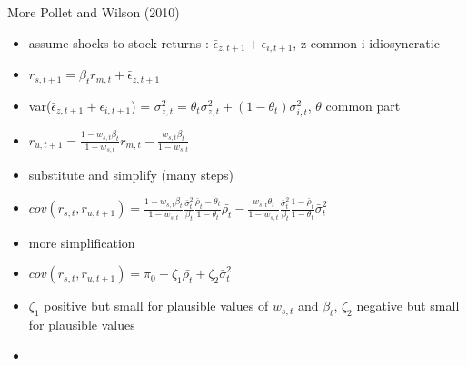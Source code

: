 \documentclass[handout]{beamer}
\begin{document}
\begin{frame}{More Pollet and Wilson (2010)}
	\begin{itemize}
		\item assume shocks to stock returns :  $\bar{\epsilon}_{z,t+1}+\epsilon_{i,t+1}$, z common i idiosyncratic
		\item $r_{s,t+1} = \beta_{t}r_{m,t} + \bar{\epsilon}_{z,t+1}$ 
		\item var($\bar{\epsilon}_{z,t+1}+\epsilon_{i,t+1}$) = $\sigma^{2}_{z,t} = \theta_{t}\sigma^{2}_{z,t} + (1-\theta_{t})\sigma^{2}_{i,t}$, $\theta$ common part
		\item $r_{u,t+1} = \frac{1-w_{s,t}\beta_{t}}{1-w_{s,t}}r_{m,t} - \frac{w_{s,t}\beta_{t}}{1-w_{s,t}}$
		\item substitute and simplify (many steps)
		\item $cov(r_{s,t},r_{u,t+1}) = \frac{1-w_{s,t}\beta_{t}}{1-w_{s,t}}\frac{\bar{\sigma}^{2}_{t}}{\beta_{t}}\frac{\bar{\rho}_{t}-\theta_{t}}{1-\theta_{t}}\bar{\rho_{t}} - \frac{w_{s,t}\theta_{t}}{1-w_{s,t}}\frac{\bar{\sigma}^{2}_{t}}{\beta_{t}}\frac{1-\bar{\rho}_{t}}{1-\theta_{t}}\bar{\sigma}^{2}_{t}$
		\item more simplification
		\item $cov(r_{s,t},r_{u,t+1}) = \pi_{0} + \zeta_{1}\bar{\rho_{t}} + \zeta_{2}\bar{\sigma}^{2}_{t}$
		\item $\zeta_{1}$ positive but small for plausible values of $w_{s,t}$ and $\beta_{t}$, $\zeta_{2}$ negative but small for plausible values
		\item \hyperlink{PWreturn}{}
	\end{itemize}
\end{frame}
\end{document}
